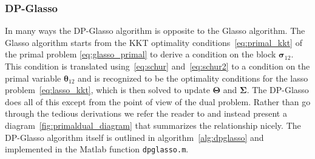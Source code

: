 \documentclass[10pt, letterpaper]{article}
\newcommand{\cov}{\boldsymbol \Sigma}
\newcommand{\scov}{\boldsymbol \sigma}
\newcommand{\preci}{\boldsymbol \Theta}
\newcommand{\spreci}{\boldsymbol \theta} %
\begin{document}
\subsubsection{DP-Glasso}

In many ways the DP-Glasso algorithm is opposite to the Glasso algorithm.  The Glasso algorithm starts from the KKT optimality conditions~\ref{eq:primal_kkt} of the primal problem \ref{eq:glasso_primal} to derive a condition on the block $\scov_{12}$.  This condition is translated using~\ref{eq:schur} and~\ref{eq:schur2} to a condition on the primal variable $\spreci_{12}$ and is recognized to be the optimality conditions for the lasso problem~\ref{eq:lasso_kkt}, which is then solved to update $\preci$ and $\cov$.  The DP-Glasso does all of this except from the point of view of the dual problem.  Rather than go through the tedious derivations we refer the reader to \cite{MH} and instead present a diagram~\ref{fig:primaldual_diagram} that summarizes the relationship nicely.  The DP-Glasso algorithm itself is outlined in algorithm~\ref{alg:dpglasso} and implemented in the Matlab function \texttt{dpglasso.m}.\\
\end{document}
